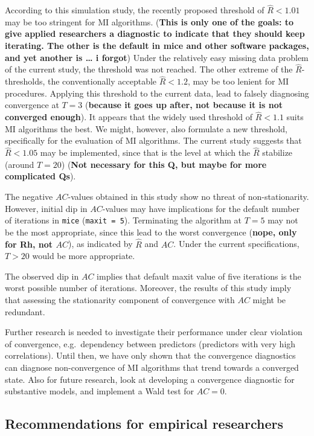 \documentclass[Royal,times,sageh]{sagej}
\begin{document}
According to this simulation study, the recently proposed threshold of
\(\widehat{R}<1.01\) may be too stringent for MI algorithms.
(\textbf{This is only one of the goals: to give applied researchers a
diagnostic to indicate that they should keep iterating. The other is the
default in mice and other software packages, and yet another is \ldots{}
i forgot}) Under the relatively easy missing data problem of the current
study, the threshold was not reached. The other extreme of the
\(\widehat{R}\)-thresholds, the conventionally acceptable
\(\widehat{R} <1.2\), may be too lenient for MI procedures. Applying
this threshold to the current data, lead to falsely diagnosing
convergence at \(T = 3\) (\textbf{because it goes up after, not because
it is not converged enough}). It appears that the widely used threshold
of \(\widehat{R} < 1.1\) suits MI algorithms the best. We might,
however, also formulate a new threshold, specifically for the evaluation
of MI algorithms. The current study suggests that \(\widehat{R} < 1.05\)
may be implemented, since that is the level at which the \(\widehat{R}\)
stabilize (around \(T = 20\)) (\textbf{Not necessary for this Q, but
maybe for more complicated Qs}).

The negative \(AC\)-values obtained in this study show no threat of
non-stationarity. However, initial dip in \(AC\)-values may have
implications for the default number of iterations in \texttt{mice}
(\texttt{maxit\ =\ 5}). Terminating the algorithm at \(T=5\) may not be
the most appropriate, since this lead to the worst convergence
(\textbf{nope, only for Rh, not \(AC\)}), as indicated by
\(\widehat{R}\) and \(AC\). Under the current specifications, \(T>20\)
would be more appropriate.

The observed dip in \(AC\) implies that default maxit value of five
iterations is the worst possible number of iterations. Moreover, the
results of this study imply that assessing the stationarity component of
convergence with \(AC\) might be redundant.

Further research is needed to investigate their performance under clear
violation of convergence, e.g.~dependency between predictors (predictors
with very high correlations). Until then, we have only shown that the
convergence diagnostics can diagnose non-convergence of MI algorithms
that trend towards a converged state. Also for future research, look at
developing a convergence diagnostic for substantive models, and
implement a Wald test for \(AC = 0\).

\hypertarget{recommendations-for-empirical-researchers}{%
\subsection{Recommendations for empirical
researchers}\label{recommendations-for-empirical-researchers}}
\end{document}
